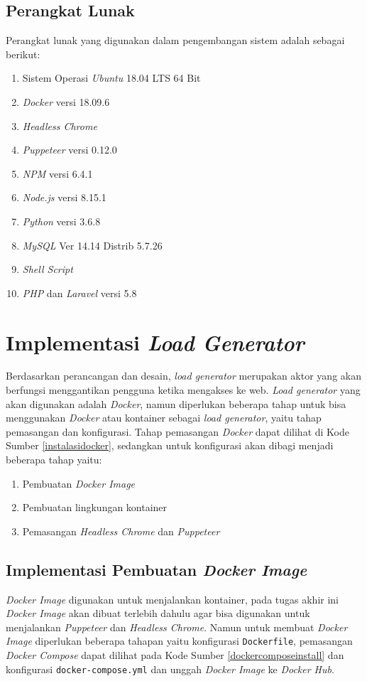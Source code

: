		\subsection{Perangkat Lunak}
		Perangkat lunak yang digunakan dalam pengembangan sistem adalah sebagai berikut:
		\begin{enumerate}
			\item Sistem Operasi \textit{Ubuntu} 18.04 LTS 64 Bit
			\item \textit{Docker} versi 18.09.6 
			\item \textit{Headless Chrome} 
			\item \textit{Puppeteer} versi 0.12.0
			\item \textit{NPM} versi 6.4.1
			\item \textit{Node.js} versi 8.15.1
			\item \textit{Python} versi 3.6.8
			\item \textit{MySQL} Ver 14.14 Distrib 5.7.26
			\item \textit{Shell Script}
			\item \textit{PHP} dan \textit{Laravel} versi 5.8
		\end{enumerate}
		
	\section{Implementasi \textit{Load Generator}}
		Berdasarkan perancangan dan desain, \textit{load generator} merupakan aktor yang akan berfungsi menggantikan pengguna ketika mengakses ke web. \textit{Load generator} yang akan digunakan adalah \textit{Docker}, namun diperlukan beberapa tahap untuk bisa menggunakan \textit{Docker} atau kontainer sebagai \textit{load generator}, yaitu tahap pemasangan dan konfigurasi. Tahap pemasangan \textit{Docker} dapat dilihat di Kode Sumber \ref{instalasidocker}, sedangkan untuk konfigurasi akan dibagi menjadi beberapa tahap yaitu:
		\begin{enumerate}
			\item Pembuatan \textit{Docker Image}
			\item Pembuatan lingkungan kontainer
			\item Pemasangan \textit{Headless Chrome} dan \textit{Puppeteer}
		\end{enumerate}
			
		\subsection{Implementasi Pembuatan \textit{Docker Image}}
			\textit{Docker Image} digunakan untuk menjalankan kontainer, pada tugas akhir ini \textit{Docker Image} akan dibuat terlebih dahulu agar bisa digunakan untuk menjalankan \textit{Puppeteer} dan \textit{Headless Chrome}. Namun untuk membuat \textit{Docker Image} diperlukan beberapa tahapan yaitu konfigurasi \texttt{Dockerfile}, pemasangan \textit{Docker Compose} dapat dilihat pada Kode Sumber \ref{dockercomposeinstall} dan konfigurasi \texttt{docker-compose.yml} dan unggah \textit{Docker Image} ke \textit{Docker Hub}.
			
